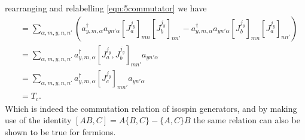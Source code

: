 \documentclass[main.tex]{subfiles}
\begin{document}
rearranging and relabelling \eqref{eqn:5commutator} we have
\begin{align}
[T_a,T_b]&=\sum_{\alpha,m,y,n,n'}(a_{y,m,\alpha}^{\dagger}a_{yn'\alpha}[J_a^{j_y}]_{mn}[J_b^{j_y}]_{nn'}-a_{y,m,\alpha}^{\dagger}a_{yn'\alpha}[J_b^{j_y}]_{mn}[J_a^{j_y}]_{nn'})\\
&=\sum_{\alpha,m,y,n,n'}a_{y,m,\alpha}^{\dagger}[J_a^{j_y},J_b^{j_y}]_{mn'}a_{yn'\alpha}\\
&=\sum_{\alpha,m,y,n,n'}a_{y,m,\alpha}^{\dagger}[J_c^{j_y}]_{mn'}a_{yn'\alpha}\\
&=T_c.
\end{align}
Which is indeed the commutation relation of isospin generators, and by making use of the identity $[AB,C]=A\{B,C\}-\{A,C\}B$ the same relation can also be shown to be true for fermions. 
\end{document}
